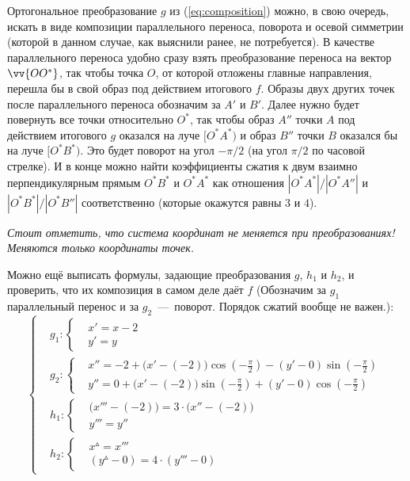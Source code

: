 \documentclass[a4paper,12pt]{article}
\begin{document}
\begin{solution}
    Ортогональное преобразование $g$ из (\ref{eq:composition}) можно, в свою очередь, искать в виде композиции параллельного переноса, поворота и осевой симметрии (которой в данном случае, как выяснили ранее, не потребуется).
    В качестве параллельного переноса удобно сразу взять преобразование переноса на вектор $\vv{OO^*}$, так чтобы точка $O$, от которой отложены главные направления, перешла бы в свой образ под действием итогового $f$.
    Образы двух других точек после параллельного переноса обозначим за $A'$ и $B'$.
    Далее нужно будет повернуть все точки относительно $O^*$, так чтобы образ $A''$ точки $A$ под действием итогового $g$ оказался на луче $[O^*A^*)$ и образ $B''$ точки $B$ оказался бы на луче $[O^*B^*)$.
    Это будет поворот на угол $-\pi/2$ (на угол $\pi/2$ по часовой стрелке).
    И в конце можно найти коэффициенты сжатия к двум взаимно перпендикулярным прямым $O^*B^*$ и $O^*A^*$ как отношения $|O^*A^*|/|O^*A''|$ и $|O^*B^*|/|O^*B''|$ соответственно (которые окажутся равны $3$ и $4$).
    
    \emph{Стоит отметить, что система координат не меняется при преобразованиях! Меняются только координаты точек.}
    
    Можно ещё выписать формулы, задающие преобразования $g$, $h_1$ и $h_2$, и проверить, что их композиция в самом деле даёт $f$ (Обозначим за $g_1$ параллельный перенос и за $g_2$~---~поворот. Порядок сжатий вообще не важен.):
    \[
      \left\{
        \begin{aligned}
          &g_1\colon \left\{
            \begin{aligned}
              &x' = x - 2\\
              &y' = y
            \end{aligned}
          \right.\\
          &g_2\colon \left\{
            \begin{aligned}
              &x{''} = -2 + \bigl(x' - (-2)\bigr)\cos{\left(-\frac{\pi}{2}\right)} - (y' - 0)\sin{\left(-\frac{\pi}{2}\right)}\\
              &y{''} = 0 + \bigl(x' - (-2)\bigr)\sin{\left(-\frac{\pi}{2}\right)} + (y' - 0)\cos{\left(-\frac{\pi}{2}\right)}
            \end{aligned}
          \right.\\
          &h_1\colon \left\{
            \begin{aligned}
              &\bigl(x{'''} - (-2)\bigr)= 3 \cdot \bigl(x{''} - (-2)\bigr)\\
              &y{'''} = y{''}
            \end{aligned}
          \right.\\
          &h_2\colon \left\{
            \begin{aligned}
              &x^{\vartriangle} = x{'''}\\
              &(y^{\vartriangle} - 0) = 4 \cdot (y{'''} - 0)
            \end{aligned}
          \right.
        \end{aligned}
      \right.
    \]
    

\end{solution}
\end{document}

